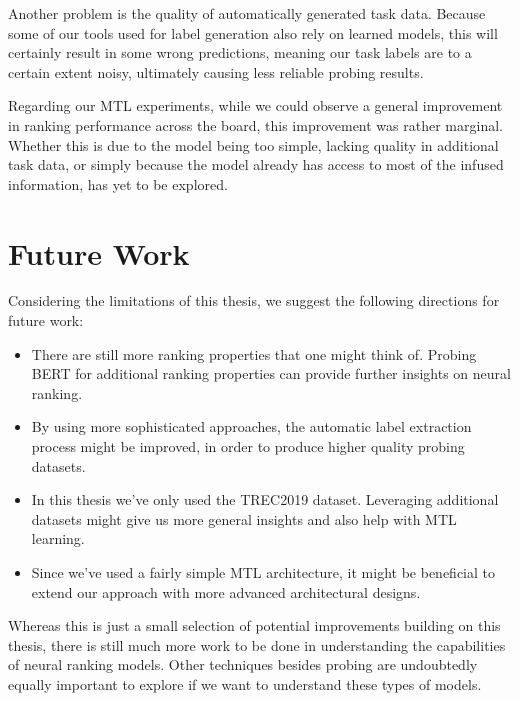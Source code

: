 Another problem is the quality of automatically generated task data. Because some of our tools used for label generation also rely on learned models, this will certainly result in some wrong predictions, meaning our task labels are to a certain extent noisy, ultimately causing less reliable probing results.

Regarding our MTL experiments, while we could observe a general improvement in ranking performance across the board, this improvement was rather marginal. Whether this is due to the model being too simple, lacking quality in additional task data, or simply because the model already has access to most of the infused information, has yet to be explored.

\section{Future Work}
\label{sec:future}
Considering the limitations of this thesis, we suggest the following directions for future work:
\begin{itemize}
    \item There are still more ranking properties that one might think of. Probing BERT for additional ranking properties can provide further insights on neural ranking.
    \item By using more sophisticated approaches, the automatic label extraction process might be improved, in order to produce higher quality probing datasets.
    \item In this thesis we've only used the TREC2019 dataset. Leveraging additional datasets might give us more general insights and also help with MTL learning.
    \item Since we've used a fairly simple MTL architecture, it might be beneficial to extend our approach with more advanced architectural designs.
\end{itemize}
Whereas this is just a small selection of potential improvements building on this thesis, there is still much more work to be done in understanding the capabilities of neural ranking models. Other techniques besides probing are undoubtedly equally important to explore if we want to understand these types of models.
